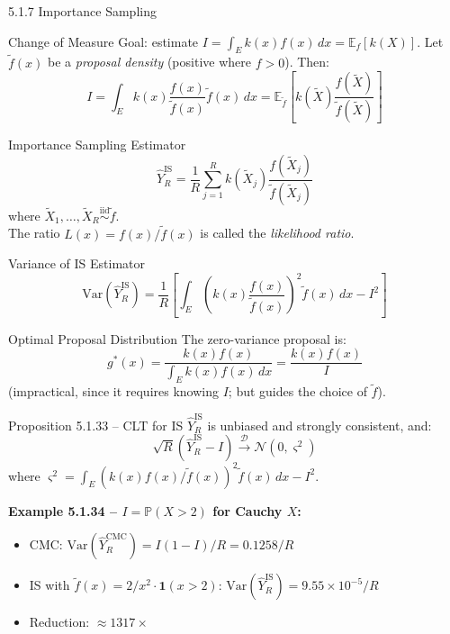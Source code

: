 \documentclass[aspectratio=169,10pt]{beamer}
\begin{document}
\begin{frame}[allowframebreaks]{5.1.7 Importance Sampling}

  \begin{block}{Change of Measure}
    Goal: estimate $I = \int_E k(x) f(x)\, dx = \mathbb{E}_f[k(X)]$.
    Let $\tilde{f}(x)$ be a \emph{proposal density} (positive where $f>0$).
    Then:
    \[
      I = \int_E k(x)\frac{f(x)}{\tilde{f}(x)}\tilde{f}(x)\,dx
        = \mathbb{E}_{\tilde{f}}\!\left[k(\tilde{X})\frac{f(\tilde{X})}{\tilde{f}(\tilde{X})}\right]
    \]
  \end{block}

  \begin{block}{Importance Sampling Estimator}
    \[
      \hat{Y}_R^{\mathrm{IS}} = \frac{1}{R}\sum_{j=1}^R k(\tilde{X}_j)\frac{f(\tilde{X}_j)}{\tilde{f}(\tilde{X}_j)}
    \]
    where $\tilde{X}_1, \ldots, \tilde{X}_R \overset{\text{iid}}{\sim} \tilde{f}$.\\[2pt]
    The ratio $L(x) = f(x)/\tilde{f}(x)$ is called the \emph{likelihood ratio}.
  \end{block}

  \framebreak

  \begin{block}{Variance of IS Estimator}
    \[
      \mathrm{Var}(\hat{Y}_R^{\mathrm{IS}}) = \frac{1}{R}
      \left[\int_E \left(k(x)\frac{f(x)}{\tilde{f}(x)}\right)^2 \tilde{f}(x)\,dx - I^2\right]
    \]
  \end{block}

  \begin{block}{Optimal Proposal Distribution}
    The zero-variance proposal is:
    \[
      g^*(x) = \frac{k(x)f(x)}{\int_E k(x)f(x)\,dx} = \frac{k(x)f(x)}{I}
    \]
    (impractical, since it requires knowing $I$; but guides the choice of $\tilde{f}$).
  \end{block}

  \begin{block}{Proposition 5.1.33 -- CLT for IS}
    $\hat{Y}_R^{\mathrm{IS}}$ is unbiased and strongly consistent, and:
    \[
      \sqrt{R}(\hat{Y}_R^{\mathrm{IS}} - I) \xrightarrow{\mathcal{D}} \mathcal{N}(0, \varsigma^2)
    \]
    where $\varsigma^2 = \int_E (k(x)f(x)/\tilde{f}(x))^2\tilde{f}(x)\,dx - I^2$.
  \end{block}

  \framebreak

  \textbf{Example 5.1.34 -- $I = \mathbb{P}(X > 2)$ for Cauchy $X$:}
  \begin{itemize}
    \item CMC: $\mathrm{Var}(\hat{Y}_R^{\mathrm{CMC}}) = I(1-I)/R = 0.1258/R$
    \item IS with $\tilde{f}(x) = 2/x^2 \cdot \mathbf{1}(x>2)$:
          $\mathrm{Var}(\hat{Y}_R^{\mathrm{IS}}) = 9.55\times10^{-5}/R$
    \item Reduction: $\approx 1317\times$
  \end{itemize}


\end{frame}
\end{document}
